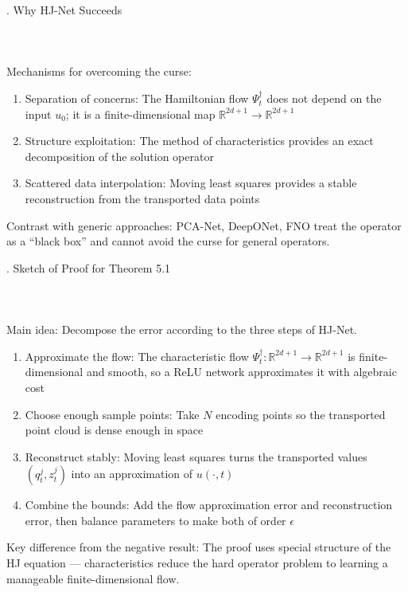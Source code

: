 \documentclass{beamer}
\def\b{\color{blue}}
\def\r{\color{red}}
\begin{document}
\begin{frame}{\thesection. Why HJ-Net Succeeds}
\framesubtitle{$\quad$}
{\Large {\b Mechanisms for overcoming the curse:}}
\medskip

{\Large 
\begin{enumerate}
    \item {\b Separation of concerns}: The Hamiltonian flow $ \Psi_t^\dagger $ does not depend on the input $ u_0 $; it is a {\r finite-dimensional} map $ \mathbb{R}^{2d+1} \to \mathbb{R}^{2d+1} $
    \item {\b Structure exploitation}: The method of characteristics provides an exact decomposition of the solution operator
    \item {\b Scattered data interpolation}: Moving least squares provides a stable reconstruction from the transported data points
\end{enumerate}
}
\medskip

{\Large {\b Contrast with generic approaches}: PCA-Net, DeepONet, FNO treat the operator as a ``black box'' and cannot avoid the curse for general operators.}

\end{frame}

\begin{frame}{\thesection. Sketch of Proof for Theorem 5.1}
\framesubtitle{$\quad$}
{\Large {\b Main idea}: Decompose the error according to the three steps of HJ-Net.}
\medskip

{\Large
\begin{enumerate}
    \item {\b Approximate the flow}: The characteristic flow $ \Psi_t^\dagger : \mathbb{R}^{2d+1} \to \mathbb{R}^{2d+1} $ is finite-dimensional and smooth, so a ReLU network approximates it with algebraic cost
    \item {\b Choose enough sample points}: Take $ N $ encoding points so the transported point cloud is dense enough in space
    \item {\b Reconstruct stably}: Moving least squares turns the transported values $ (q_t^j,z_t^j) $ into an approximation of $ u(\cdot,t) $
    \item {\b Combine the bounds}: Add the flow approximation error and reconstruction error, then balance parameters to make both of order $ \epsilon $
\end{enumerate}
}
\medskip

{\Large {\b Key difference from the negative result}: The proof uses special structure of the HJ equation --- characteristics reduce the hard operator problem to learning a manageable finite-dimensional flow.}

\end{frame}
\end{document}
